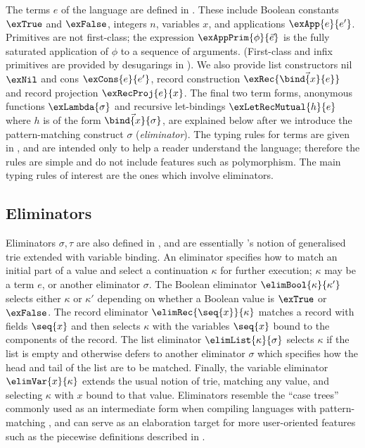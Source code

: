 The terms $e$ of the language are defined in . These include Boolean constants $\exTrue$ and $\exFalse$, integers $n$, variables $x$, and applications $\exApp{e}{e'}$. Primitives are not first-class; the expression $\exAppPrim{\phi}{\vec{e}}$ is the fully saturated application of $\phi$ to a sequence of arguments. (First-class and infix primitives are provided by desugarings in ). We also provide list constructors nil $\exNil$ and cons $\exCons{e}{e'}$, record construction $\exRec{\vec{\bind{x}{e}}}$ and record projection $\exRecProj{e}{x}$. The final two term forms, anonymous functions $\exLambda{\sigma}$ and recursive let-bindings $\exLetRecMutual{h}{e}$ where $h$ is of the form $\vec{\bind{x}{\sigma}}$, are explained below after we introduce the pattern-matching construct $\sigma$ (\emph{eliminator}). The typing rules for terms are given in , and are intended only to help a reader understand the language; therefore the rules are simple and do not include features such as polymorphism. The main typing rules of interest are the ones which involve eliminators.

\subsection{Eliminators}
\label{sec:core-language:syntax-eliminator}

Eliminators $\sigma, \tau$ are also defined in , and are essentially \citeauthor{connelly95}'s notion of generalised trie \cite{connelly95,hinze00} extended with variable binding. An eliminator specifies how to match an initial part of a value and select a continuation $\kappa$ for further execution; $\kappa$ may be a term $e$, or another eliminator $\sigma$. The Boolean eliminator $\elimBool{\kappa}{\kappa'}$ selects either $\kappa$ or $\kappa'$ depending on whether a Boolean value is $\exTrue$ or $\exFalse$. The record eliminator $\elimRec{\seq{x}}{\kappa}$ matches a record with fields $\seq{x}$ and then selects $\kappa$ with the variables $\seq{x}$ bound to the components of the record. The list eliminator $\elimList{\kappa}{\sigma}$ selects $\kappa$ if the list is empty and otherwise defers to another eliminator $\sigma$ which specifies how the head and tail of the list are to be matched. Finally, the variable eliminator $\elimVar{x}{\kappa}$ extends the usual notion of trie, matching any value, and selecting $\kappa$ with $x$ bound to that value. Eliminators resemble the ``case trees'' commonly used as an intermediate form when compiling languages with pattern-matching \cite{graf20}, and can serve as an elaboration target for more user-oriented features such as the piecewise definitions described in .

